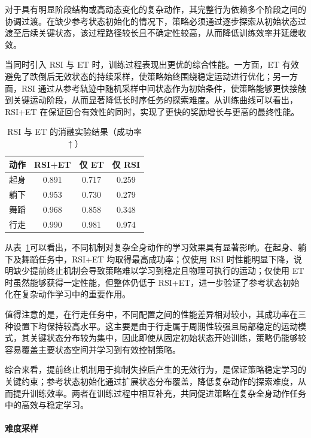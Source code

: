 对于具有明显阶段结构或高动态变化的复杂动作，其完整行为依赖多个阶段之间的协调过渡。在缺少参考状态初始化的情况下，策略必须通过逐步探索从初始状态过渡至后续关键状态，该过程路径较长且不确定性较高，从而降低训练效率并延缓收敛。

当同时引入 RSI 与 ET 时，训练过程表现出更优的综合性能。一方面，ET 有效避免了跌倒后无效状态的持续采样，使策略始终围绕稳定运动进行优化；另一方面，RSI 通过从参考轨迹中随机采样中间状态作为初始条件，使策略能够更快接触到关键运动阶段，从而显著降低长时序任务的探索难度。从训练曲线可以看出，RSI+ET 在保证回合有效性的同时，实现了更快的奖励增长与更高的最终性能。


\begin{table}[htbp]
	\centering
	\caption{RSI 与 ET 的消融实验结果（成功率 $\uparrow$）}
	\label{tab:ablation_result}
	\begin{tabular}{lccc}
		\toprule
		\textbf{动作} & \textbf{RSI+ET} & \textbf{仅 ET} & \textbf{仅 RSI} \\
		\midrule
		起身 & 0.891 & 0.717 & 0.259 \\
		躺下 & 0.953 & 0.730 & 0.279 \\
		舞蹈 & 0.968 & 0.858 & 0.348 \\
		行走 & 0.990 & 0.981 & 0.974 \\
		\bottomrule
	\end{tabular}
\end{table}

从表~\ref{tab:ablation_result}可以看出，不同机制对复杂全身动作的学习效果具有显著影响。在起身、躺下及舞蹈任务中，RSI+ET 均取得最高成功率；仅使用 RSI 时性能明显下降，说明缺少提前终止机制会导致策略难以学习到稳定且物理可执行的运动；仅使用 ET 时虽然能够获得一定性能，但整体仍低于 RSI+ET，进一步验证了参考状态初始化在复杂动作学习中的重要作用。

值得注意的是，在行走任务中，不同配置之间的性能差异相对较小，其成功率在三种设置下均保持较高水平。这主要是由于行走属于周期性较强且局部稳定的运动模式，其关键状态分布较为集中，因此即使从固定初始状态开始训练，策略仍能够较容易覆盖主要状态空间并学习到有效控制策略。

综合来看，提前终止机制用于抑制失控后产生的无效行为，是保证策略稳定学习的关键约束；参考状态初始化通过扩展状态分布覆盖，降低复杂动作的探索难度，从而提升训练效率。两者在训练过程中相互补充，共同促进策略在复杂全身动作任务中的高效与稳定学习。

\paragraph{难度采样}

